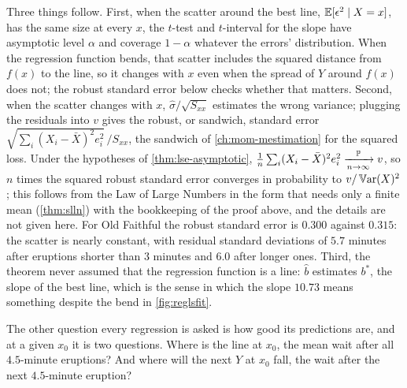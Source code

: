 Three things follow.
First, when the scatter around the best line, $\operatorname*{\mathbb{E}}[\epsilon^2 \mid X = x]$, has the same size at every $x$, the $t$-test and $t$-interval for the slope have asymptotic level $\alpha$ and coverage $1 - \alpha$ whatever the errors' distribution. When the regression function bends, that scatter includes the squared distance from $f(x)$ to the line, so it changes with $x$ even when the spread of $Y$ around $f(x)$ does not; the robust standard error below checks whether that matters.
Second, when the scatter changes with $x$, $\hat{\sigma}/\sqrt{S_{xx}}$ estimates the wrong variance; plugging the residuals into $v$ gives the robust, or sandwich, standard error $\sqrt{\sum_i (X_i - \bar{X})^2e_i^2}\,/S_{xx}$, the sandwich of \cref{ch:mom-mestimation} for the squared loss. Under the hypotheses of \cref{thm:lse-asymptotic}, $\frac1n\sum_i (X_i - \bar{X})^2e_i^2 \xrightarrow [n \to \infty ]{\mathbb{P}} v$, so $n$ times the squared robust standard error converges in probability to $v/\operatorname*{\mathbb{V}\text{ar}}(X)^2$; this follows from the Law of Large Numbers in the form that needs only a finite mean (\cref{thm:slln}) with the bookkeeping of the proof above, and the details are not given here. For Old Faithful the robust standard error is $0.300$ against $0.315$: the scatter is nearly constant, with residual standard deviations of $5.7$ minutes after eruptions shorter than $3$ minutes and $6.0$ after longer ones.
Third, the theorem never assumed that the regression function is a line: $\hat{b}$ estimates $b^*$, the slope of the best line, which is the sense in which the slope $10.73$ means something despite the bend in \cref{fig:reglsfit}.

The other question every regression is asked is how good its predictions are, and at a given $x_0$ it is two questions.
Where is the line at $x_0$, the mean wait after all $4.5$-minute eruptions?
And where will the next $Y$ at $x_0$ fall, the wait after the next $4.5$-minute eruption?

